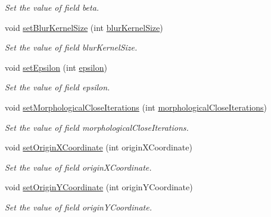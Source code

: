 \begin{DoxyCompactItemize}
\begin{DoxyCompactList}\small\item\em \-Set the value of field beta. \end{DoxyCompactList}\item 
void \hyperlink{classmultiscale_1_1analysis_1_1RegionDetector_a968d5ddbc060fa823e4c79c9dcfec300}{set\-Blur\-Kernel\-Size} (int \hyperlink{classmultiscale_1_1analysis_1_1RegionDetector_aae6ee0ec7f0a610dd8a906c1eb181bc7}{blur\-Kernel\-Size})
\begin{DoxyCompactList}\small\item\em \-Set the value of field blur\-Kernel\-Size. \end{DoxyCompactList}\item 
void \hyperlink{classmultiscale_1_1analysis_1_1RegionDetector_a069ed208d5ff16e6caa0deb4ff21858b}{set\-Epsilon} (int \hyperlink{classmultiscale_1_1analysis_1_1RegionDetector_acf21910fadd7c6ef2810743a78a0aeb9}{epsilon})
\begin{DoxyCompactList}\small\item\em \-Set the value of field epsilon. \end{DoxyCompactList}\item 
void \hyperlink{classmultiscale_1_1analysis_1_1RegionDetector_a5e096d2e4ff8dfe985869d6d0fcd74b8}{set\-Morphological\-Close\-Iterations} (int \hyperlink{classmultiscale_1_1analysis_1_1RegionDetector_a700a2f299d7c56fbd1fdbec68092f23a}{morphological\-Close\-Iterations})
\begin{DoxyCompactList}\small\item\em \-Set the value of field morphological\-Close\-Iterations. \end{DoxyCompactList}\item 
void \hyperlink{classmultiscale_1_1analysis_1_1RegionDetector_a9ace9f195f33aab9597f8a7c107c219d}{set\-Origin\-X\-Coordinate} (int origin\-X\-Coordinate)
\begin{DoxyCompactList}\small\item\em \-Set the value of field origin\-X\-Coordinate. \end{DoxyCompactList}\item 
void \hyperlink{classmultiscale_1_1analysis_1_1RegionDetector_a2e7fa31b11734cdd3f7fc7db55cedab8}{set\-Origin\-Y\-Coordinate} (int origin\-Y\-Coordinate)
\begin{DoxyCompactList}\small\item\em \-Set the value of field origin\-Y\-Coordinate. \end{DoxyCompactList}\item 

\end{DoxyCompactItemize}
